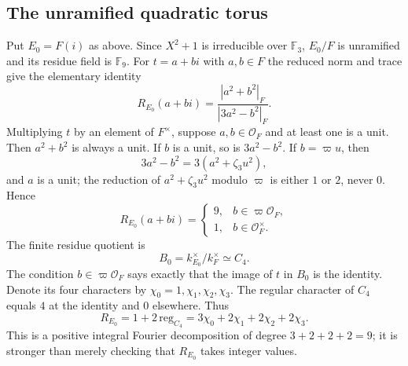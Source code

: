 \documentclass[11pt]{article}
\theoremstyle{plain}
\theoremstyle{definition}
\begin{document}
\subsection{The unramified quadratic torus}
Put $E_0=F(i)$ as above.  Since $X^2+1$ is irreducible over
$\mathbb F_3$, $E_0/F$ is unramified and its residue field is
$\mathbb F_9$.  For $t=a+bi$ with $a,b\in F$ the reduced norm
and trace give the elementary identity
\begin{equation}\label{eq:quadratic-R}
 R_{E_0}(a+bi)=
 \frac{|a^2+b^2|_F}{|3a^2-b^2|_F}.
\end{equation}
Multiplying $t$ by an element of $F^\times$, suppose
$a,b\in\mathcal O_F$ and at least one is a unit.
Then $a^2+b^2$ is always a unit.  If $b$ is a unit, so is
$3a^2-b^2$.  If $b=\varpi u$, then
\[
 3a^2-b^2=3(a^2+\zeta_3u^2),
\]
and $a$ is a unit; the reduction of $a^2+\zeta_3u^2$ modulo
$\varpi$ is either $1$ or $2$, never $0$.  Hence
\begin{equation}\label{eq:unram-values}
 R_{E_0}(a+bi)=
 \begin{cases}
 9,&b\in\varpi\mathcal O_F,\\
 1,&b\in\mathcal O_F^\times.
 \end{cases}
\end{equation}
The finite residue quotient is
\[
 B_0=k_{E_0}^\times/k_F^\times
 \simeq C_4.
\]
The condition $b\in\varpi\mathcal O_F$ says exactly that the
image of $t$ in $B_0$ is the identity.  Denote its four characters
by $\chi_0=1,\chi_1,\chi_2,\chi_3$.  The regular character of
$C_4$ equals $4$ at the identity and $0$ elsewhere. Thus
\begin{equation}\label{eq:unram-fourier}
 \boxed{\quad
 R_{E_0}=1+2\,\mathrm{reg}_{C_4}
 =3\chi_0+2\chi_1+2\chi_2+2\chi_3.
 \quad}
\end{equation}
This is a positive integral Fourier decomposition of degree
$3+2+2+2=9$; it is stronger than merely checking that
$R_{E_0}$ takes integer values.
\end{document}
